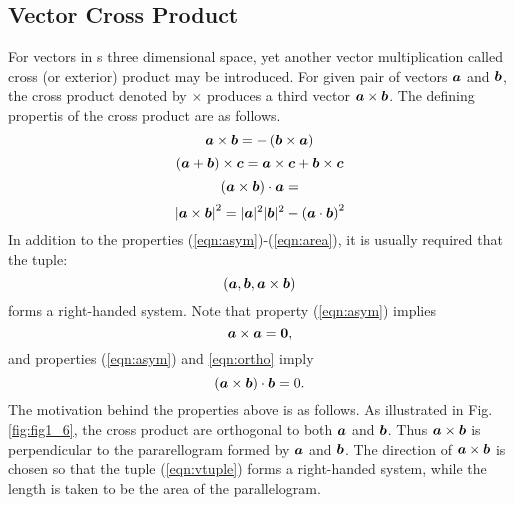 \documentclass[10pt,a4j]{article}
\begin{document}
\subsection{Vector Cross Product} 
For vectors in s three dimensional space, yet another vector multiplication called 
cross (or exterior) product may be introduced. For given pair of vectors $\mbox{\boldmath $a$}$ and $\mbox{\boldmath $b$}$, 
the cross product denoted by $\times$ produces a third vector $\mbox{\boldmath $a$}\times \mbox{\boldmath $b$}$. 
The defining propertis of the cross product are as follows. 
\begin{equation}
	\mbox{\boldmath $a$}\times \mbox{\boldmath $b$}= -\left(\mbox{\boldmath $b$} \times \mbox{\boldmath $a$} \right)
	\label{eqn:asym}
\end{equation}
\begin{equation}
	\left(\mbox{\boldmath $a$}+\mbox{\boldmath $b$}\right)\times \mbox{\boldmath $c$}
	=
	\mbox{\boldmath $a$}\times \mbox{\boldmath $c$}+ \mbox{\boldmath $b$}\times \mbox{\boldmath $c$}
	\label{eqn:}
\end{equation}
\begin{equation}
	\left(\mbox{\boldmath $a$}\times\mbox{\boldmath $b$}\right)\cdot\mbox{\boldmath $a$} =
	\label{eqn:ortho}
\end{equation}
\begin{equation}
	\left|\mbox{\boldmath $a$}\times \mbox{\boldmath $b$} \right|^2=|\mbox{\boldmath $a$}|^2|\mbox{\boldmath $b$}|^2-\left(\mbox{\boldmath $a$}\cdot\mbox{\boldmath $b$}\right)^2
	\label{eqn:area}
\end{equation}
In addition to the properties (\ref{eqn:asym})-(\ref{eqn:area}), it is usually 
required that the tuple:
\begin{equation}
	\left(\mbox{\boldmath $a$},\mbox{\boldmath $b$},\mbox{\boldmath $a$}\times \mbox{\boldmath $b$} \right)
	\label{eqn:vtuple}
\end{equation}
forms a right-handed system.
Note that property (\ref{eqn:asym}) implies 
\begin{equation}
	\mbox{\boldmath $a$}\times \mbox{\boldmath $a$}=\mbox{\boldmath $0$}, 
	\label{eqn:}
\end{equation}
and properties (\ref{eqn:asym}) and \ref{eqn:ortho} imply 
\begin{equation}
	\left(\mbox{\boldmath $a$}\times\mbox{\boldmath $b$}\right)\cdot\mbox{\boldmath $b$} =0. 
	\label{eqn:}
\end{equation}
The motivation behind the properties above is as follows. 
As illustrated in Fig.\ref{fig:fig1_6}, the cross product are orthogonal to 
both $\mbox{\boldmath $a$}$ and $\mbox{\boldmath $b$}$. Thus $\mbox{\boldmath $a$}\times \mbox{\boldmath $b$}$ is perpendicular 
to the pararellogram formed by $\mbox{\boldmath $a$}$ and $\mbox{\boldmath $b$}$. 
The direction of $\mbox{\boldmath $a$}\times\mbox{\boldmath $b$}$ is chosen so that the tuple (\ref{eqn:vtuple}) 
forms a right-handed system, while the length is taken to be the area of 
the parallelogram. 
\end{document}
